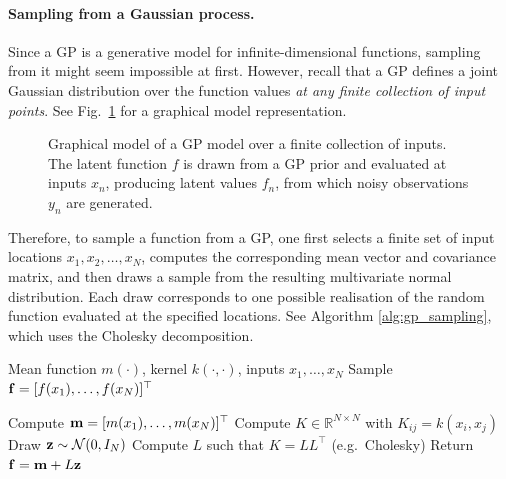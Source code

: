 \paragraph{Sampling from a Gaussian process.}

Since a GP is a generative model for infinite-dimensional functions, sampling from it might seem impossible at first. However, recall that a GP defines a joint Gaussian distribution over the function values \emph{at any finite collection of input points}. See Fig.~\ref{fig:gp_graphical_model_full} for a graphical model representation.


\begin{figure}[H]
\centering
{}
\caption{Graphical model of a GP model over a finite collection of inputs.
The latent function \(f\) is drawn from a GP prior and evaluated at inputs \(x_n\), producing latent values \(f_n\), from which noisy observations \(y_n\) are generated.}
\label{fig:gp_graphical_model_full}
\end{figure}


Therefore, to sample a function from a GP, one first selects a finite set of input locations $x_1,x_2,\ldots,x_N$, computes the corresponding mean vector and covariance matrix, and then draws a sample from the resulting multivariate normal distribution. Each draw corresponds to one possible realisation of the random function evaluated at the specified locations. See Algorithm \ref{alg:gp_sampling}, which uses the Cholesky decomposition.

\begin{algorithm}[H]
\caption{Sampling from a Gaussian Process}
\label{alg:gp_sampling}
\begin{algorithmic}[1]
\Require Mean function \(m(\cdot)\), kernel \(k(\cdot,\cdot)\), inputs \(x_1,\ldots,x_N\)
\Ensure Sample \({ \mathbf{f}} = [f(x_1),\ldots,f(x_N)]^\top\)

\State Compute \({ \mathbf{m}} = [m(x_1),\ldots,m(x_N)]^\top\)
\State Compute \(K\in\mathbb R^{N\times N}\) with \(K_{ij}=k(x_i,x_j)\)
\State Draw \({ \mathbf{z}} \sim \mathcal N(0,I_N)\)
\State Compute \(L\) such that \(K=LL^\top\) (e.g.\ Cholesky)
\State Return \({ \mathbf{f}} = { \mathbf{m}} + L{ \mathbf{z}}\)

\end{algorithmic}
\end{algorithm}

